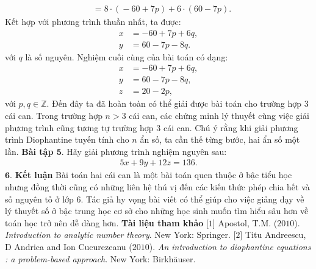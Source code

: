 \begin{multicols}{2}
\begin{align*}
		&=8\!\cdot\! (\!-\!60\!+\!7p)\!+\!6\!\cdot\! (60\!-\!7p).
	\end{align*}
	Kết hợp với phương trình thuần nhất, ta được:
	\begin{align*}
		x&=-60+7p+6q,\\
		y&=60-7p-8q.
	\end{align*}
	với $q$ là số nguyên.
	\vskip 0.1cm
	Nghiệm cuối cùng của bài toán có dạng:
	\begin{align*}
		x&=-60+7p+6q,\\
		y&=60-7p-8q,\\
		z&=20-2p,
	\end{align*}
	với $p,q \in \mathbb{Z}$.
	\vskip 0.1cm
	Đến đây ta đã hoàn toàn có thể giải được bài toán cho trường hợp $3$ cái can.
	\vskip 0.1cm
	Trong trường hợp $n>3$ cái can, các chứng minh lý thuyết cùng việc giải phương trình cũng tương tự trường hợp $3$ cái can. Chú ý rằng khi giải phương trình Diophantine tuyến tính cho $n$ ẩn số, ta cần thế từng bước, hai ẩn số một lần.
	\vskip 0.1cm
	\textbf{\color{hoccungpi}Bài tập $\pmb{5.}$}
	Hãy giải phương trình nghiệm nguyên sau:
	\begin{align*}
		5x+9y+12z=136.
	\end{align*}
	$\pmb{6.}$ \textbf{\color{hoccungpi}Kết luận}
	\vskip 0.1cm
	Bài toán hai cái can là một bài toán quen thuộc ở bậc tiểu học nhưng đồng thời cũng có những liên hệ thú vị đến các kiến thức phép chia hết và số nguyên tố ở lớp $6$. Tác giả hy vọng bài viết có thể giúp cho việc giảng dạy về lý thuyết số ở bậc trung học cơ sở cho những học sinh muốn tìm hiểu sâu hơn về toán học trở nên dễ dàng hơn.
	\vskip 0.1cm
	\textbf{\color{hoccungpi}Tài liệu tham khảo}
	\vskip 0.1cm
	[$1$] Apostol, T.M. ($2010$). \textit{Introduction to analytic number theory}. New York: Springer.
	\vskip 0.1cm
	[$2$] Titu Andreescu, D Andrica and Ion Cucurezeanu ($2010$). \textit{An introduction to diophantine equations : a problem-based approach}. New York: Birkhäuser.
\end{multicols}